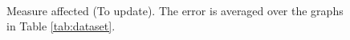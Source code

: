 \begin{figure}[!hbt]
  \centering
   \\[-2ex]
\caption{Measure affected (To update). The error is averaged over the graphs in Table \ref{tab:dataset}.}
  \label{fig:measure-affected}
\end{figure}
